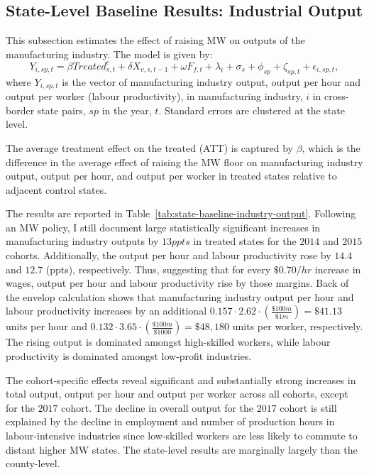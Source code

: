 \documentclass[authoryear, preprint, twocolumn, 1p]{elsarticle}
\begin{document}
    \subsection{State-Level Baseline Results: Industrial Output}\label{subsec:state-level-baseline-results-industrial-output}
    This subsection estimates the effect of raising MW on outputs of the manufacturing industry. The model is given by:
    \begin{equation}
        Y_{i,sp,t} = \beta Treated_{s,t}^e + \delta X_{v,s,t-1} + \omega F_{f,t} + \lambda_{t} + \sigma_{s} + \phi_{sp} + \zeta_{sp,t} + \epsilon_{i,sp,t},\label{eq:state-baseline-output}
    \end{equation}
    where $Y_{i,sp,t}$ is the vector of manufacturing industry output, output per hour and output per worker (labour productivity), in manufacturing industry, $i$ in cross-border state pairs, $sp$ in the year, $t$. Standard errors are clustered at the state level.
    

    The average treatment effect on the treated (ATT) is captured by $\beta$, which is the difference in the average effect of raising the MW floor on manufacturing industry output, output per hour, and output per worker in treated states relative to adjacent control states.

    The results are reported in Table~\ref{tab:state-baseline-industry-output}. Following an MW policy, I still document large statistically significant increases in manufacturing industry outputs by $13ppts$ in treated states for the $2014$ and $2015$ cohorts. Additionally, the output per hour and labour productivity rose by $14.4$ and $12.7$ (ppts), respectively. Thus, suggesting that for every $\$0.70/hr$ increase in wages, output per hour and labour productivity rise by those margins. Back of the envelop calculation shows that manufacturing industry output per hour and labour productivity increases by an additional $0.157 \cdot 2.62 \cdot \left(\frac{\$100m}{\$1m}\right) = \$41.13$ units per hour and $0.132 \cdot 3.65 \cdot \left(\frac{\$100m}{\$1000}\right) = \$48,180$ units per worker, respectively. The rising output is dominated amongst high-skilled workers, while labour productivity is dominated amongst low-profit industries.

    The cohort-specific effects reveal significant and substantially strong increases in total output, output per hour and output per worker across all cohorts, except for the $2017$ cohort. The decline in overall output for the $2017$ cohort is still explained by the decline in employment and number of production hours in labour-intensive industries since low-skilled workers are less likely to commute to distant higher MW states. The state-level results are marginally largely than the county-level.
\end{document}

